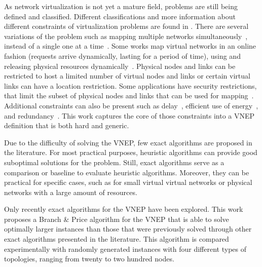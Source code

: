 As network virtualization is not yet a mature field, problems are still being defined and classified. Different classifications and more information about different constraints of virtualization problems are found in \cite{Fischer:2011,Chowdhury2010,FischerSurvey}.
There are several variations of the problem such as mapping multiple networks simultaneously~\cite{Houidi:2011}, instead of a single one at a time~\cite{Chowdhury2010}.
Some works map virtual networks in an online fashion (requests arrive dynamically, lasting for a period of time), using and releasing physical resources dynamically~\cite{Yu2008}. 
Physical nodes and links can be restricted to host a limited number of virtual nodes and links or certain virtual links can have a location restriction.
Some applications have security restrictions, that limit the subset of physical nodes and links that can be used for mapping~\cite{Buriol:2012}.
Additional constraints can also be present such as delay~\cite{infuhr:2011}, efficient use of energy~\cite{Botero:2012}, and redundancy~\cite{Shamsi:2008}. 
This work captures the core of those constraints into a VNEP definition that is both hard and generic.



Due to the difficulty of solving the VNEP, few exact algorithms are proposed in the literature.
For most practical purposes, heuristic algorithms can provide good suboptimal solutions for the problem.
Still, exact algorithms serve as a comparison or baseline to evaluate heuristic algorithms.
Moreover, they can be practical for specific cases, such as for small virtual virtual networks or physical networks with a large amount of resources.



Only recently exact algorithms for the VNEP have been explored.
This work proposes a Branch \& Price algorithm for the VNEP that is able to solve optimally larger instances than those that were previously solved through other exact algorithms presented in the literature. This algorithm is compared experimentally with randomly generated instances with four different types of topologies, ranging from twenty to two hundred nodes.

